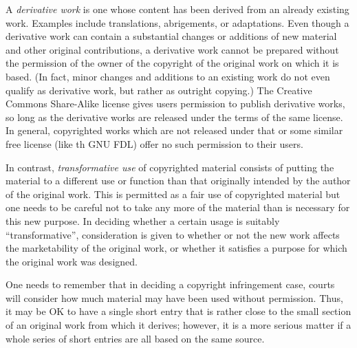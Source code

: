 A \emph{derivative work} is one whose content has been derived from an
already existing work. Examples include translations, abrigements, or
adaptations. Even though a derivative work can contain a substantial
changes or additions of new material and other original contributions,
a derivative work cannot be prepared without the permission of the
owner of the copyright of the original work on which it is based. (In
fact, minor changes and additions to an existing work do not even
qualify as derivative work, but rather as outright copying.) The 
Creative Commons Share-Alike license gives users permission to publish 
derivative works, so long as the derivative works are released under 
the terms of the same license. In general, copyrighted works which are
not released under that or some similar free license (like th GNU FDL)
offer no such permission to their users.

In contrast, \emph{transformative use} of copyrighted material
consists of putting the material to a different use or function than
that originally intended by the author of the original work. This is
permitted as a fair use of copyrighted material but one needs to be
careful not to take any more of the material than is necessary for
this new purpose. In deciding whether a certain usage is suitably
``transformative'', consideration is given to whether or not the new
work affects the marketability of the original work, or whether it 
satisfies a purpose for which the original work was designed.

One needs to remember that in deciding a copyright infringement case,
courts will consider how much material may have been used without
permission. Thus, it may be OK to have a single short entry that is
rather close to the small section of an original work from which it
derives; however, it is a more serious matter if a whole series of
short entries are all based on the same source.
